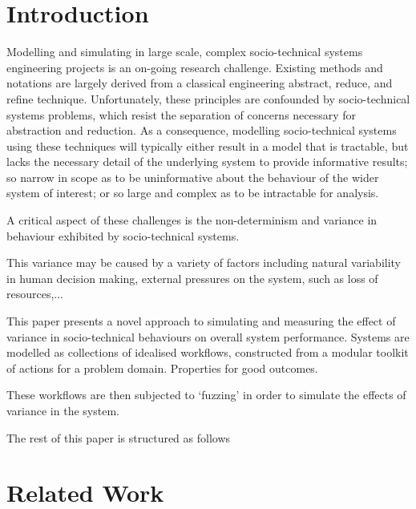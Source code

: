 \documentclass{sig-alternate}
\begin{document}

\section{Introduction}


Modelling and simulating in large scale, complex socio-technical systems
engineering projects is an on-going research challenge.  Existing methods and
notations are largely derived from a classical engineering abstract, reduce, and
refine technique.  Unfortunately, these principles are confounded by
socio-technical systems problems, which resist the separation of concerns
necessary for abstraction and reduction.  As a consequence, modelling
socio-technical systems using these techniques will typically either result in a
model that is tractable, but lacks the necessary detail of the underlying system
to provide informative results; so narrow in scope as to be uninformative about
the behaviour of the wider system of interest; or so large and complex as to be
intractable for analysis.

A critical aspect of these challenges is the non-determinism and variance in
behaviour exhibited by socio-technical systems.

This variance may be caused by a variety of factors including natural
variability in human decision making, external pressures on the system, such as
loss of resources,...

This paper presents a novel approach to simulating and measuring the effect of
variance in socio-technical behaviours on overall system performance.  Systems
are modelled as collections of idealised workflows, constructed from a modular
toolkit of actions for a problem domain.  Properties for good outcomes.

  These workflows are then subjected to
`fuzzing' in order to simulate the effects of variance in the system.

The rest of this paper is structured as follows


\section{Related Work}
\end{document}

